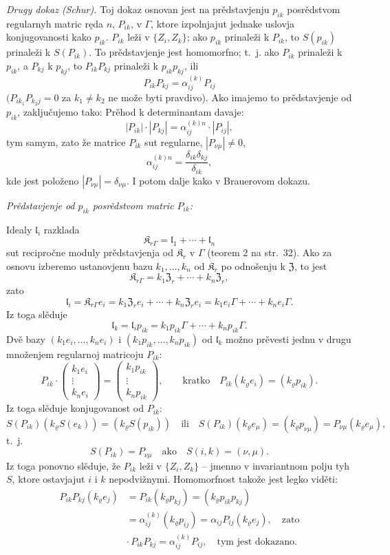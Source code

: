 \documentclass[11pt]{article}
\begin{document}
\emph{Drugy dokaz (Schur).} Toj dokaz osnovan jest na prědstavjenju \(p_{ik}\) posrědstvom regularnyh matric ręda \(n\), \(P_{ik}\), v \(\Gamma\), ktore izpolnjajut jednake uslovja konjugovanosti kako \(p_{ik}\). \(P_{ik}\) leži v \(\{Z_i,Z_k\}\); ako \(p_{ik}\) prinaleži k \(P_{ik}\), to \(S(p_{ik})\) prinaleži k \(S(P_{ik})\). To prědstavjenje jest homomorfno; t.~j. ako \(P_{ik}\) prinaleži k \(p_{ik}\), a \(P_{kj}\) k \(p_{kj}\), to \(P_{ik}P_{kj}\) prinaleži k \(p_{ik}p_{kj}\), ili
\[
P_{ik}P_{kj}=\alpha_{ij}^{(k)}P_{ij}
\]
\((P_{ik_1}P_{k_2j}=0\) za \(k_1\neq k_2\) ne može byti pravdivo). Ako imajemo to prědstavjenje od \(p_{ik}\), zaključujemo tako: Prěhod k determinantam davaje:
\[
|P_{ik}|\cdot |P_{kj}|=\alpha_{ij}^{(k)n}\cdot |P_{ij}|,
\]
tym samym, zato že matrice \(P_{ik}\) sut regularne, \(|P_{\nu\mu}|\ne0\),
\[
\alpha_{ij}^{(k)n}=\frac{\delta_{ik}\delta_{kj}}{\delta_{ik}},
\]
kde jest položeno \(|P_{\nu\mu}|=\delta_{\nu\mu}\). I potom dalje kako v Brauerovom dokazu.

\emph{Prědstavjenje od \(p_{ik}\) posrědstvom matric \(P_{ik}\):}

Idealy \(\mathfrak l_i\) razklada
\[
\mathfrak K_{r\Gamma}=\mathfrak l_1+\cdots+\mathfrak l_n
\]
sut recipročne moduly prědstavjenja od \(\mathfrak K_r\) v \(\Gamma\) (teorem 2 na str.~32). Ako za osnovu izberemo ustanovjenu bazu \(k_1,\ldots,k_n\) od \(\mathfrak K_r\) po odnošenju k \(\mathfrak Z\), to jest
\[
\mathfrak K_{r\Gamma}=k_1\mathfrak Z_r+\cdots+k_n\mathfrak Z_r,
\]
zato
\[
\mathfrak l_i=\mathfrak K_{r\Gamma}e_i
=k_1\mathfrak Z_r e_i+\cdots+k_n\mathfrak Z_r e_i
=k_1e_i\Gamma+\cdots+k_ne_i\Gamma.
\]
Iz toga slěduje
\[
\mathfrak l_k=\mathfrak l_i p_{ik}
=k_1p_{ik}\Gamma+\cdots+k_np_{ik}\Gamma.
\]
Dvě bazy \((k_1e_i,\ldots,k_ne_i)\) i \((k_1p_{ik},\ldots,k_np_{ik})\) od \(\mathfrak l_k\) možno prěvesti jednu v drugu množenjem regularnoj matricoju \(P_{ik}\):
\[
P_{ik}\cdot
\begin{pmatrix}
k_1e_i\\ \vdots\\ k_ne_i
\end{pmatrix}
=
\begin{pmatrix}
k_1p_{ik}\\ \vdots\\ k_np_{ik}
\end{pmatrix},
\qquad
\text{kratko}\quad
P_{ik}(k_\varrho e_i)=(k_\varrho p_{ik}).
\]
Iz toga slěduje konjugovanost od \(P_{ik}\):
\[
S(P_{ik})(k_\varrho S(e_k))=(k_\varrho S(p_{ik}))
\quad\text{ili}\quad
S(P_{ik})(k_\varrho e_\mu)=(k_\varrho p_{\nu\mu})
=P_{\nu\mu}(k_\varrho e_\mu),
\]
t.~j.
\[
S(P_{ik})=P_{\nu\mu}\quad\text{ako}\quad S(i,k)=(\nu,\mu).
\]
Iz toga ponovno slěduje, že \(P_{ik}\) leži v \(\{Z_i,Z_k\}\) -- jmenno v invariantnom polju tyh \(S\), ktore ostavjajut \(i\) i \(k\) nepodvižnymi. Homomorfnost takože jest legko viděti:
\[
\begin{split}
P_{ik}P_{kj}(k_\varrho e_j)
&=P_{ik}(k_\varrho p_{kj})
=(k_\varrho p_{ik}p_{kj})\\
&=\alpha_{ij}^{(k)}(k_\varrho p_{ij})
=\alpha_{ij}P_{ij}(k_\varrho e_j),
\quad\text{zato}\\
&\cdot\, P_{ik}P_{kj}=\alpha_{ij}^{(k)}P_{ij},
\quad\text{tym jest dokazano.}
\end{split}
\]
\end{document}
